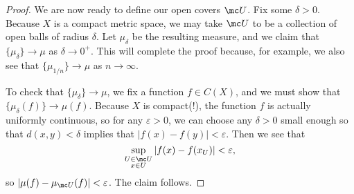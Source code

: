 \documentclass[../notes.tex]{subfiles}
\begin{document}
\begin{proof}
	We are now ready to define our open covers $\mc U$. Fix some $\delta>0$. Because $X$ is a compact metric space, we may take $\mc U$ to be a collection of open balls of radius $\delta$. Let $\mu_\delta$ be the resulting measure, and we claim that $\{\mu_\delta\}\to\mu$ as $\delta\to0^+$. This will complete the proof because, for example, we also see that $\{\mu_{1/n}\}\to\mu$ as $n\to\infty$.

	To check that $\{\mu_\delta\}\to\mu$, we fix a function $f\in C(X)$, and we must show that $\{\mu_\delta(f)\}\to\mu(f)$. Because $X$ is compact(!), the function $f$ is actually uniformly continuous, so for any $\varepsilon>0$, we can choose any $\delta>0$ small enough so that $d(x,y)<\delta$ implies that $\left|f(x)-f(y)\right|<\varepsilon$. Then we see that
	\[\sup_{\substack{U\in\mc U\\x\in U}}\left|f(x)-f(x_U)\right|<\varepsilon,\]
	so $\left|\mu(f)-\mu_{\mc U}(f)\right|<\varepsilon$. The claim follows.
\end{proof}
\end{document}
